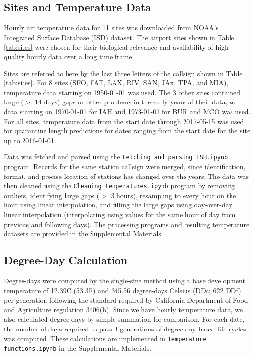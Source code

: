 \documentclass[10pt,a4paper,twocolumn]{article}
\begin{document}
\subsection*{Sites and Temperature Data}
Hourly air temperature data for 11 sites was downloaded from 
NOAA's Integrated Surface Database (ISD) dataset\cite{smith_integrated_2011,NOAA_ISD_portal}.
The airport sites shown in Table \ref{tab:sites}
were chosen for their biological relevance and 
availability of high quality hourly data over a long time frame.

Sites are referred to here by the last three letters of the callsign shown in Table \ref{tab:sites}.
For 8 sites (SFO, FAT, LAX, RIV, SAN, JAx, TPA, and MIA), temperature data starting on 1950-01-01 was used.
The 3 other sites contained large ($>$ 14 days) gaps or other problems in the early years of their data,
so data starting on 1970-01-01 for IAH and 1973-01-01 for BUR and MCO was used.
For all sites, temperature data from the start date through 2017-05-15 was used
for quarantine length predictions for dates ranging from the start date for the site up to 2016-01-01.

Data was fetched and parsed using the \texttt{Fetching and parsing ISH.ipynb} program.
Records for the same station callsign were merged, since identification, format, 
and precise location of stations has changed over the years.
The data was then cleaned using the 
\texttt{Cleaning temperatures.ipynb} program by 
removing outliers, 
identifying large gaps ($>$ 3 hours), 
resampling to every hour on the hour using linear interpolation,
and filling the large gaps using day-over-day linear interpolation
(interpolating using values for the same hour of day from previous and following days).
The processing programs and resulting temperature datasets are 
provided in the Supplemental Materials.


\subsection*{Degree-Day Calculation}
Degree-days were computed by the single-sine method\cite{ECY:ECY1969503514}
using a base development temperature of 12.39\degree C (53.3\degree F) 
and 345.56 degree-days Celsius (DDc; 622 DDf) per generation 
following the standard required by California Department of Food and Agriculture
regulation 3406(b)\cite{CDFA_Medfly,3-CA-ADC-3406}.
Since we have hourly temperature data, we also calculated degree-days by simple summation
for comparison\cite{Roltsch1999}.
For each date, the number of days required to pass 3 generations of degree-day 
based life cycles was computed.
These calculations are implemented in \texttt{Temperature functions.ipynb} in the Supplemental Materials.
\end{document}
